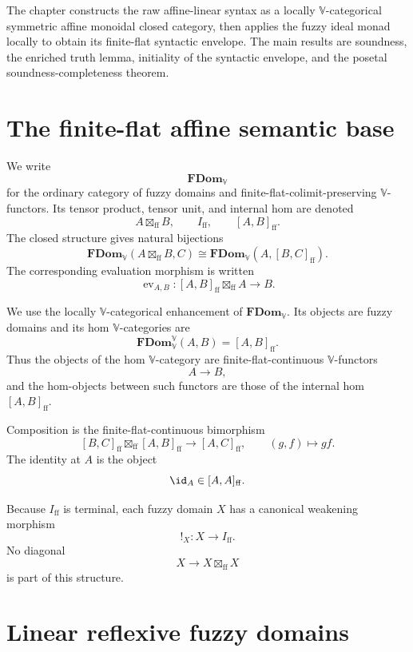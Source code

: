 The chapter constructs the raw affine-linear syntax as a locally
\(\mathbb V\)-categorical symmetric affine monoidal closed category, then
applies the fuzzy ideal monad locally to obtain its finite-flat syntactic
envelope.  The main results are soundness, the enriched truth lemma,
initiality of the syntactic envelope, and the posetal soundness-completeness
theorem.

\section{The finite-flat affine semantic base}
\label{sec:finite-flat-affine-semantic-base}

We write
\[
    \mathbf{FDom}_{\mathbb V}
\]
for the ordinary category of fuzzy domains and finite-flat-colimit-preserving
\(\mathbb V\)-functors.  Its tensor product, tensor unit, and internal hom are
denoted
\[
    A\boxtimes_{\mathrm{ff}}B,
    \qquad
    I_{\mathrm{ff}},
    \qquad
    [A,B]_{\mathrm{ff}}.
\]
The closed structure gives natural bijections
\[
    \mathbf{FDom}_{\mathbb V}
    (A\boxtimes_{\mathrm{ff}}B,C)
    \cong
    \mathbf{FDom}_{\mathbb V}
    (A,[B,C]_{\mathrm{ff}}).
\]
The corresponding evaluation morphism is written
\[
    \operatorname{ev}_{A,B}:
    [A,B]_{\mathrm{ff}}\boxtimes_{\mathrm{ff}}A
    \longrightarrow B.
\]

We use the locally \(\mathbb V\)-categorical enhancement of
\(\mathbf{FDom}_{\mathbb V}\).  Its objects are fuzzy domains and its hom
\(\mathbb V\)-categories are
\[
    \mathbf{FDom}_{\mathbb V}^{\mathbb V}(A,B)
    =
    [A,B]_{\mathrm{ff}}.
\]
Thus the objects of the hom \(\mathbb V\)-category are finite-flat-continuous
\(\mathbb V\)-functors
\[
    A\to B,
\]
and the hom-objects between such functors are those of the internal hom
\([A,B]_{\mathrm{ff}}\).

Composition is the finite-flat-continuous bimorphism
\[
    [B,C]_{\mathrm{ff}}
    \boxtimes_{\mathrm{ff}}
    [A,B]_{\mathrm{ff}}
    \longrightarrow
    [A,C]_{\mathrm{ff}},
    \qquad
    (g,f)\longmapsto gf.
\]
The identity at \(A\) is the object
\[
    \id_A\in[A,A]_{\mathrm{ff}}.
\]

Because \(I_{\mathrm{ff}}\) is terminal, each fuzzy domain \(X\) has a canonical
weakening morphism
\[
    {!}_X:X\longrightarrow I_{\mathrm{ff}}.
\]
No diagonal
\[
    X\longrightarrow X\boxtimes_{\mathrm{ff}}X
\]
is part of this structure.

\section{Linear reflexive fuzzy domains}
\label{sec:linear-reflexive-fuzzy-domains}


